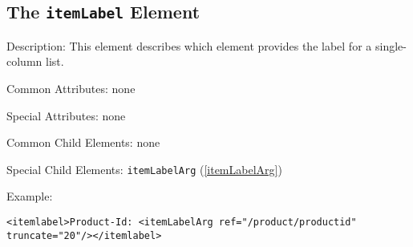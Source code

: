 \subsection{ The \texttt{itemLabel} Element}
\label{itemLabel}
\begin{description}
 \item Description: This element describes which element provides the label for a single-column list.

 \item Common Attributes: none

 \item Special Attributes: none

 \item Common Child Elements: none

 \item Special Child Elements: \texttt{itemLabelArg} (\ref{itemLabelArg})

 \item Example: 

\begin{lstlisting}[caption=\texttt{itemLabel} Element]
<itemlabel>Product-Id: <itemLabelArg ref="/product/productid" truncate="20"/></itemlabel>
\end{lstlisting}
\end{description}





